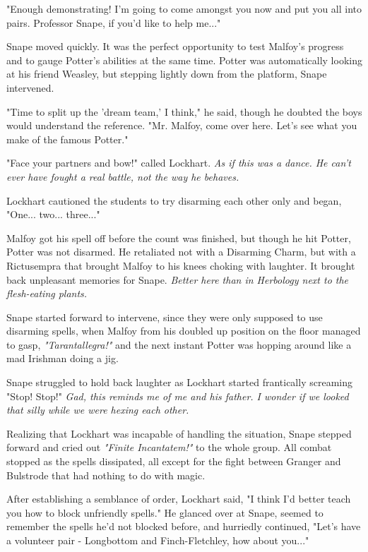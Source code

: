 \documentclass[a4paper,11pt]{article}
\begin{document}
"Enough demonstrating! I'm going to come amongst you now and put you all into pairs. Professor Snape, if you'd like to help me..."

Snape moved quickly. It was the perfect opportunity to test Malfoy's progress and to gauge Potter's abilities at the same time. Potter was automatically looking at his friend Weasley, but stepping lightly down from the platform, Snape intervened.

"Time to split up the 'dream team,' I think," he said, though he doubted the boys would understand the reference. "Mr. Malfoy, come over here. Let's see what you make of the famous Potter."

"Face your partners and bow!" called Lockhart. \emph{As if this was a dance. He can't ever have fought a real battle, not the way he behaves.}

Lockhart cautioned the students to try disarming each other only and began, "One... two... three..."

Malfoy got his spell off before the count was finished, but though he hit Potter, Potter was not disarmed. He retaliated not with a Disarming Charm, but with a Rictusempra that brought Malfoy to his knees choking with laughter. It brought back unpleasant memories for Snape. \emph{Better here than in Herbology next to the flesh-eating plants.}

Snape started forward to intervene, since they were only supposed to use disarming spells, when Malfoy from his doubled up position on the floor managed to gasp, \emph{"Tarantallegra!"} and the next instant Potter was hopping around like a mad Irishman doing a jig.

Snape struggled to hold back laughter as Lockhart started frantically screaming "Stop! Stop!" \emph{Gad, this reminds me of me and his father. I wonder if we looked that silly while we were hexing each other.}

Realizing that Lockhart was incapable of handling the situation, Snape stepped forward and cried out \emph{"Finite Incantatem!"} to the whole group. All combat stopped as the spells dissipated, all except for the fight between Granger and Bulstrode that had nothing to do with magic.

After establishing a semblance of order, Lockhart said, "I think I'd better teach you how to block unfriendly spells." He glanced over at Snape, seemed to remember the spells he'd not blocked before, and hurriedly continued, "Let's have a volunteer pair - Longbottom and Finch-Fletchley, how about you..."
\end{document}
